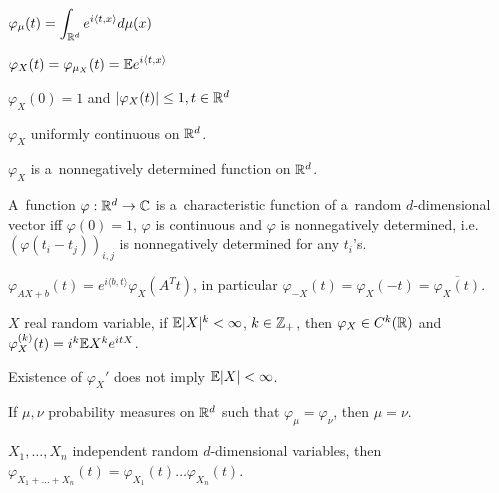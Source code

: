 



	\begin{definition}
		$\displaystyle\varphi_\mu(t) = \int_{\mathbb{R}^d} e^{i\langle t,x\rangle}d\mu(x)$
		
		$\displaystyle\varphi_X(t) = \varphi_{\mu_X}(t) = \mathbb{E} e^{i\langle t,x\rangle}$
	\end{definition}
	
	\begin{proposition}
		$\varphi_X(0) = 1$ and $|\varphi_X(t)| \leq 1, t \in \mathbb{R}^d$
	\end{proposition}
	
	\begin{proposition}
		$\varphi_X$ uniformly continuous on $\mathbb{R}^d$.
	\end{proposition}
	
	\begin{proposition}
		$\varphi_X$ is a~nonnegatively determined function on $\mathbb{R}^d$.
	\end{proposition}
	
	\begin{theorem}[Bochner]
		A~function $\varphi:\mathbb{R}^d \to {\mathbb{C}}$ is a~characteristic function of a~random $d$-dimensional vector iff $\varphi(0)=1$, $\varphi$ is continuous and $\varphi$ is nonnegatively determined, i.e. $(\varphi(t_i - t_j))_{i,j}$ is nonnegatively determined for any $t_i$'s.
	\end{theorem}
	
	\begin{proposition}
		$\varphi_{AX+b}(t) = e^{i \langle b,t\rangle} \varphi_X(A^T t)$, in particular $\varphi_{-X}(t) = \varphi_X(-t) = \overline{\varphi_X(t)}$.
	\end{proposition}
	
	\begin{proposition}
		$X$ real random variable, if $\mathbb{E} |X|^k < \infty$, $k \in {\mathbb{Z}}_+$, then $\varphi_X \in C^k(\mathbb{R})$ and $\varphi_X^{(k)}(t) = i^k \mathbb{E} X^k e^{itX}$.
	\end{proposition}
	
	\begin{remark}
		Existence of $\varphi_X'$ does not imply $\mathbb{E} |X| < \infty$.
	\end{remark}
	
	\begin{proposition}
		If $\mu, \nu$ probability measures on $\mathbb{R}^d$ such that $\varphi_\mu = \varphi_\nu$, then $\mu = \nu$.
	\end{proposition}
	
	\begin{proposition}
		$X_1, \ldots, X_n$ independent random $d$-dimensional variables, then $\varphi_{X_1 + \ldots + X_n} (t) = \varphi_{X_1}(t) \ldots \varphi_{X_n}(t)$.
	\end{proposition}









 
 
